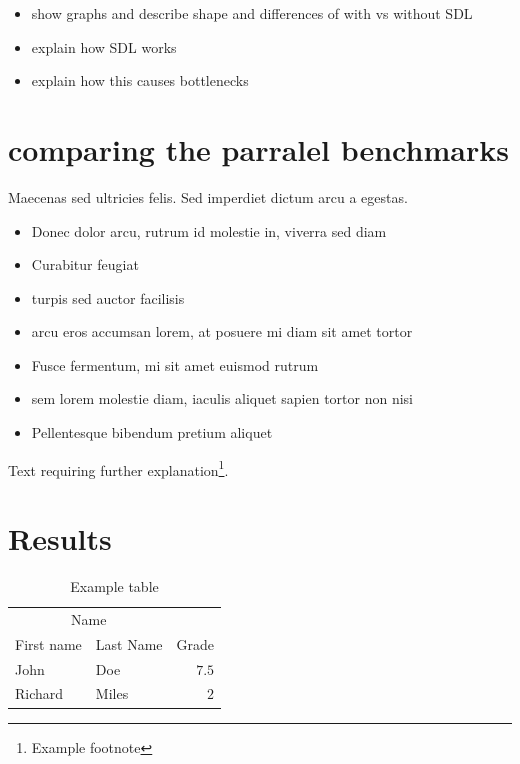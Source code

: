 \documentclass[twoside,twocolumn]{article}
\begin{document}
\begin{itemize}
  \item show graphs and describe shape and differences of with vs without SDL
  \item explain how SDL works
  \item explain how this causes bottlenecks
\end{itemize}

\section{comparing the parralel benchmarks}

Maecenas sed ultricies felis. Sed imperdiet dictum arcu a egestas. 
\begin{itemize}
\item Donec dolor arcu, rutrum id molestie in, viverra sed diam
\item Curabitur feugiat
\item turpis sed auctor facilisis
\item arcu eros accumsan lorem, at posuere mi diam sit amet tortor
\item Fusce fermentum, mi sit amet euismod rutrum
\item sem lorem molestie diam, iaculis aliquet sapien tortor non nisi
\item Pellentesque bibendum pretium aliquet
\end{itemize}
\blindtext %

Text requiring further explanation\footnote{Example footnote}.


\section{Results}

\begin{table}
\caption{Example table}
\centering
\begin{tabular}{llr}
\toprule
\multicolumn{2}{c}{Name} \\
\cmidrule(r){1-2}
First name & Last Name & Grade \\
\midrule
John & Doe & $7.5$ \\
Richard & Miles & $2$ \\
\bottomrule
\end{tabular}
\end{table}
\end{document}
